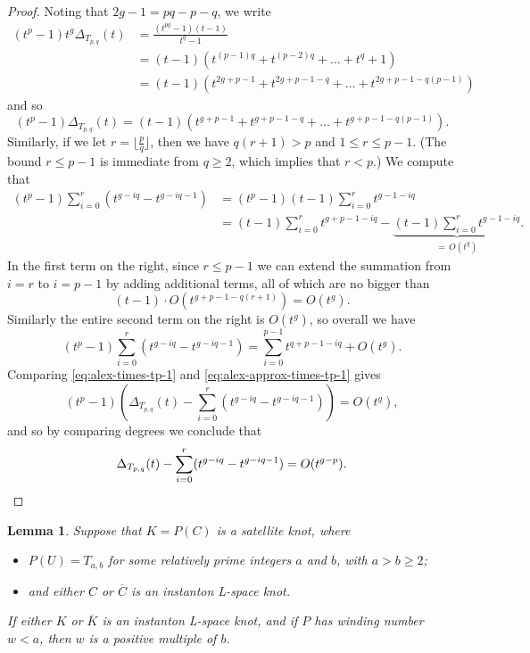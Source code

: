 \documentclass[11pt]{amsart}
\newtheorem {lemma}[theorem]{Lemma}
\numberwithin{equation}{section}
\numberwithin{theorem}{section}
\theoremstyle{definition}
\newcommand{\mirror}[1]{\overline{#1}}
\begin{document}
\begin{proof}
Noting that $2g-1 = pq-p-q$, we write 
\begin{align*}
(t^p-1) t^g \Delta_{T_{p,q}}(t) &= \frac{(t^{pq}-1)(t-1)}{t^q-1} \\
&= (t-1)\left( t^{(p-1)q} + t^{(p-2)q} + \dots + t^q + 1 \right) \\
&= (t-1)\left( t^{2g+p-1} + t^{2g+p-1-q} + \dots + t^{2g+p-1 - q(p-1)}\right)
\end{align*}
and so
\begin{equation} \label{eq:alex-times-tp-1}
(t^p-1)\Delta_{T_{p,q}}(t) = (t-1)\left( t^{g+p-1} + t^{g+p-1-q} + \dots + t^{g+p-1 - q(p-1)}\right).
\end{equation}
Similarly, if we let $r=\lfloor \frac{p}{q} \rfloor$, then we have $q(r+1) > p$ and $1 \leq r \leq p-1$.  (The bound $r\leq p-1$ is immediate from $q \geq 2$, which implies that $r < p$.) We compute that
\begin{align*}
(t^p-1)\sum_{i=0}^{r} (t^{g-iq} - t^{g-iq-1}) &= (t^p-1)(t-1)\sum_{i=0}^r t^{g-1-iq} \\
&= (t-1)\sum_{i=0}^r t^{g+p-1-iq} - \underbrace{(t-1)\sum_{i=0}^r t^{g-1-iq}}_{=\,O(t^g)}.
\end{align*}
In the first term on the right, since $r \leq p-1$ we can extend the summation from $i=r$ to $i=p-1$ by adding additional terms, all of which are no bigger than
\[ (t-1) \cdot O(t^{g+p-1-q(r+1)}) = O(t^g). \]
Similarly the entire second term on the right is $O(t^g)$, so overall we have
\begin{equation} \label{eq:alex-approx-times-tp-1}
(t^p-1)\sum_{i=0}^{r} (t^{g-iq} - t^{g-iq-1}) = \sum_{i=0}^{p-1} t^{q+p-1-iq} + O(t^g).
\end{equation}
Comparing \eqref{eq:alex-times-tp-1} and \eqref{eq:alex-approx-times-tp-1} gives
\[ (t^p-1)\left(\Delta_{T_{p,q}}(t) - \sum_{i=0}^{r} (t^{g-iq} - t^{g-iq-1})\right) = O(t^g), \]
and so by comparing degrees we conclude that
\[ \Delta_{T_{p,q}}(t) - \sum_{i=0}^{r} (t^{g-iq} - t^{g-iq-1}) = O(t^{g-p}). \qedhere \]
\end{proof}

\begin{lemma} \label{lem:w-mod-b}
Suppose that $K=P(C)$ is a satellite knot, where
\begin{itemize}
\item $P(U)=T_{a,b}$ for some relatively prime integers $a$ and $b$, with $a > b \geq 2$;
\item and either $C$ or $\mirror{C}$ is an instanton L-space knot.
\end{itemize}
If either $K$ or $\mirror{K}$ is an instanton L-space knot, and if $P$ has winding number $w < a$, then $w$ is a positive multiple of $b$.
\end{lemma}
\end{document}
